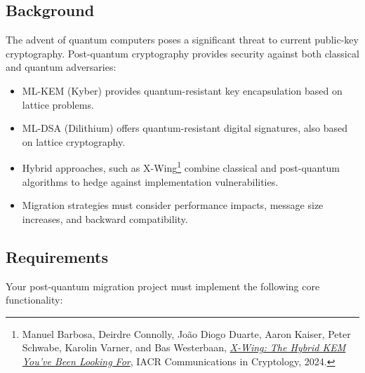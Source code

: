 \documentclass[10pt,a4paper,american]{exam}
\begin{document}
\subsection*{Background}
The advent of quantum computers poses a significant threat to current public-key cryptography. Post-quantum cryptography provides security against both classical and quantum adversaries:
\begin{itemize}
	\item ML-KEM (Kyber) provides quantum-resistant key encapsulation based on lattice problems.
	\item ML-DSA (Dilithium) offers quantum-resistant digital signatures, also based on lattice cryptography.
	\item Hybrid approaches, such as X-Wing\footnote{Manuel Barbosa, Deirdre Connolly, Jo\~ao Diogo Duarte, Aaron Kaiser, Peter Schwabe, Karolin Varner, and Bas Westerbaan, \href{https://appliedcryptography.page/paper/\#xwing-hybrid}{\textit{X-Wing: The Hybrid KEM You've Been Looking For}}, IACR Communications in Cryptology, 2024.} combine classical and post-quantum algorithms to hedge against implementation vulnerabilities.
	\item Migration strategies must consider performance impacts, message size increases, and backward compatibility.
\end{itemize}

\subsection*{Requirements}
Your post-quantum migration project must implement the following core functionality:
\end{document}
